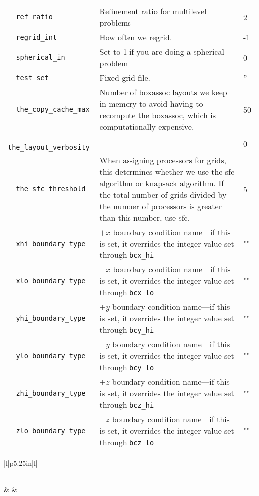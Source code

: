 \begin{landscape}
{\begin{center}
\begin{longtable}{|l|p{5.25in}|l|}
\verb=  ref_ratio  = &   Refinement ratio for multilevel problems  &  2 \\
\rowcolor{tableShade}
\verb=  regrid_int  = &   How often we regrid.  &  -1 \\
\verb=  spherical_in  = &   Set to 1 if you are doing a spherical problem.  &  0 \\
\rowcolor{tableShade}
\verb=  test_set  = &   Fixed grid file.  &  '' \\
\verb=  the_copy_cache_max  = &    Number of boxassoc layouts we keep in memory to avoid having to recompute the boxassoc, which is computationally expensive.  &  50 \\
\rowcolor{tableShade}
\verb=  the_layout_verbosity  = &    &  0 \\
\verb=  the_sfc_threshold  = &   When assigning processors for grids, this determines whether we use the sfc algorithm or knapsack algorithm.  If the total number of grids divided by the number of processors is greater than this number, use sfc.  &  5 \\
\rowcolor{tableShade}
\verb=  xhi_boundary_type  = &   $+x$ boundary condition name---if this is set, it overrides the integer value set through {\tt bcx\_hi}  &  "" \\
\verb=  xlo_boundary_type  = &   $-x$ boundary condition name---if this is set, it overrides the integer value set through {\tt bcx\_lo}  &  "" \\
\rowcolor{tableShade}
\verb=  yhi_boundary_type  = &   $+y$ boundary condition name---if this is set, it overrides the integer value set through {\tt bcy\_hi}  &  "" \\
\verb=  ylo_boundary_type  = &   $-y$ boundary condition name---if this is set, it overrides the integer value set through {\tt bcy\_lo}  &  "" \\
\rowcolor{tableShade}
\verb=  zhi_boundary_type  = &   $+z$ boundary condition name---if this is set, it overrides the integer value set through {\tt bcz\_hi}  &  "" \\
\verb=  zlo_boundary_type  = &   $-z$ boundary condition name---if this is set, it overrides the integer value set through {\tt bcz\_lo}  &  "" \\


\end{longtable}
\end{center}

} %


{\small

\renewcommand{\arraystretch}{1.5}
%
\begin{center}
\begin{longtable}{|l|p{5.25in}|l|}
\caption[ heating
 parameters.]{ heating
 parameters.} \label{table:  heating
 parameters. runtime} \\
%
\hline {} & 
        & 
        \\ \hline 
\endfirsthead


\end{longtable}
\end{center}}
\end{landscape}
